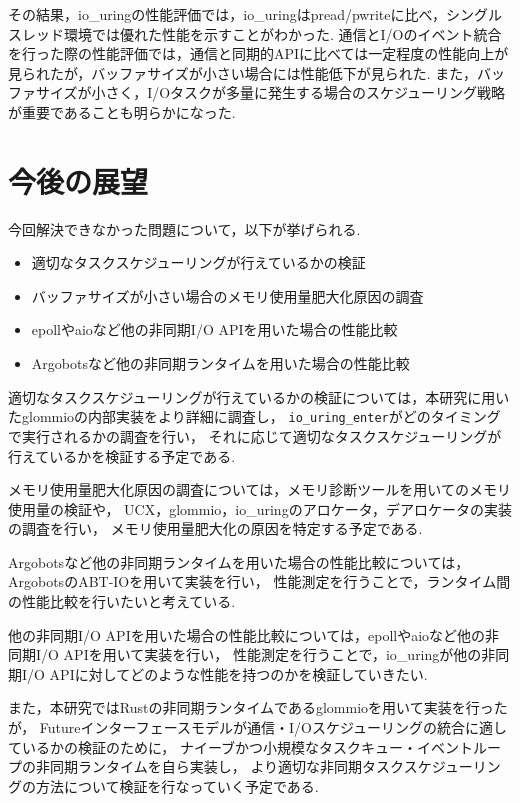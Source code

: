 \documentclass[a4paper,11pt,openany]{jreport}
\begin{document}
その結果，io\_uringの性能評価では，io\_uringはpread/pwriteに比べ，シングルスレッド環境では優れた性能を示すことがわかった.
通信とI/Oのイベント統合を行った際の性能評価では，通信と同期的APIに比べては一定程度の性能向上が見られたが，バッファサイズが小さい場合には性能低下が見られた.
また，バッファサイズが小さく，I/Oタスクが多量に発生する場合のスケジューリング戦略が重要であることも明らかになった.

\section{今後の展望}
今回解決できなかった問題について，以下が挙げられる.

\begin{itemize}
	\item 適切なタスクスケジューリングが行えているかの検証
	\item バッファサイズが小さい場合のメモリ使用量肥大化原因の調査
	\item epollやaioなど他の非同期I/O APIを用いた場合の性能比較
	\item Argobotsなど他の非同期ランタイムを用いた場合の性能比較
\end{itemize}

適切なタスクスケジューリングが行えているかの検証については，本研究に用いたglommioの内部実装をより詳細に調査し，
\lstinline|io_uring_enter|がどのタイミングで実行されるかの調査を行い，
それに応じて適切なタスクスケジューリングが行えているかを検証する予定である.

メモリ使用量肥大化原因の調査については，メモリ診断ツールを用いてのメモリ使用量の検証や，
UCX，glommio，io\_uringのアロケータ，デアロケータの実装の調査を行い，
メモリ使用量肥大化の原因を特定する予定である.

Argobotsなど他の非同期ランタイムを用いた場合の性能比較については，　ArgobotsのABT-IOを用いて実装を行い，
性能測定を行うことで，ランタイム間の性能比較を行いたいと考えている.

他の非同期I/O APIを用いた場合の性能比較については，epollやaioなど他の非同期I/O APIを用いて実装を行い，
性能測定を行うことで，io\_uringが他の非同期I/O APIに対してどのような性能を持つのかを検証していきたい.

また，本研究ではRustの非同期ランタイムであるglommioを用いて実装を行ったが，
Futureインターフェースモデルが通信・I/Oスケジューリングの統合に適しているかの検証のために，
ナイーブかつ小規模なタスクキュー・イベントループの非同期ランタイムを自ら実装し，
より適切な非同期タスクスケジューリングの方法について検証を行なっていく予定である.
\end{document}
